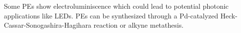 Some PEs show electroluminiscence which could lead to potential photonic applications like LEDs. \cite{HIROHATA19971273}
PEs can be synthesized through a Pd-catalyzed Heck-Cassar-Sonogashira-Hagihara reaction or alkyne metathesis.\cite{Bunz2001}






